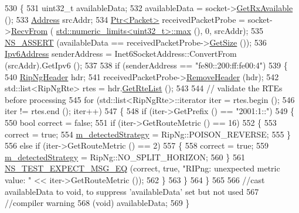 \begin{DoxyCode}
530 \{
531   uint32\_t availableData;
532   availableData = socket->\hyperlink{classns3_1_1Socket_ad35d8931e53ae0754ee864acb1cecd0e}{GetRxAvailable} ();
533   \hyperlink{classns3_1_1Address}{Address} srcAddr;
534   \hyperlink{classns3_1_1Ptr}{Ptr<Packet>} receivedPacketProbe = socket->\hyperlink{classns3_1_1Socket_af22378d7af9a2745a9eada20210da215}{RecvFrom} (
      \hyperlink{80211b_8c_affe776513b24d84b39af8ab0930fef7f}{std::numeric\_limits<uint32\_t>::max} (), 0, srcAddr);
535   \hyperlink{assert_8h_a6dccdb0de9b252f60088ce281c49d052}{NS\_ASSERT} (availableData == receivedPacketProbe->\hyperlink{classns3_1_1Packet_a462855c9929954d4301a4edfe55f4f1c}{GetSize} ());
536   \hyperlink{classns3_1_1Ipv6Address}{Ipv6Address} senderAddress = Inet6SocketAddress::ConvertFrom (srcAddr).GetIpv6 ();
537 
538   \textcolor{keywordflow}{if} (senderAddress == \textcolor{stringliteral}{"fe80::200:ff:fe00:4"})
539     \{
540       \hyperlink{classns3_1_1RipNgHeader}{RipNgHeader} hdr;
541       receivedPacketProbe->\hyperlink{classns3_1_1Packet_a0961eccf975d75f902d40956c93ba63e}{RemoveHeader} (hdr);
542       std::list<RipNgRte> rtes = hdr.\hyperlink{classns3_1_1RipNgHeader_ab97e746464b2d1ff94b4b438c7d5c577}{GetRteList} ();
543 
544       \textcolor{comment}{// validate the RTEs before processing}
545       \textcolor{keywordflow}{for} (std::list<RipNgRte>::iterator iter = rtes.begin ();
546           iter != rtes.end (); iter++)
547         \{
548           \textcolor{keywordflow}{if} (iter->GetPrefix () == \textcolor{stringliteral}{"2001:1::"})
549             \{
550               \textcolor{keywordtype}{bool} correct = \textcolor{keyword}{false};
551               \textcolor{keywordflow}{if} (iter->GetRouteMetric () == 16)
552                 \{
553                   correct = \textcolor{keyword}{true};
554                   \hyperlink{classIpv6RipngSplitHorizonStrategyTest_a67c77e54ff8eccc14b3d197dbff2a8f7}{m\_detectedStrategy} = RipNg::POISON\_REVERSE;
555                 \}
556               \textcolor{keywordflow}{else} \textcolor{keywordflow}{if} (iter->GetRouteMetric () == 2)
557                 \{
558                   correct = \textcolor{keyword}{true};
559                   \hyperlink{classIpv6RipngSplitHorizonStrategyTest_a67c77e54ff8eccc14b3d197dbff2a8f7}{m\_detectedStrategy} = RipNg::NO\_SPLIT\_HORIZON;
560                 \}
561               \hyperlink{group__testing_ga7304ba46a28d8cf08dfdfd6499cf7068}{NS\_TEST\_EXPECT\_MSG\_EQ} (correct, \textcolor{keyword}{true}, \textcolor{stringliteral}{"RIPng: unexpected metric value: "}
       << iter->GetRouteMetric ());
562             \}
563         \}
564     \}
565 
566   \textcolor{comment}{//cast availableData to void, to suppress 'availableData' set but not used}
567   \textcolor{comment}{//compiler warning}
568   (void) availableData;
569 \}
\end{DoxyCode}


